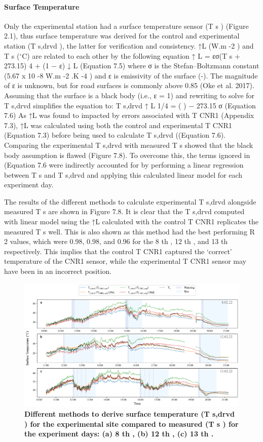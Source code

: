 \documentclass[final,3p,times,authoryear]{elsarticle}
\begin{document}
\paragraph{Surface Temperature}\label{sec:appendix7.4.2}

Only the experimental station had a surface temperature sensor (T s ) (Figure 2.1), thus
surface temperature was derived for the control and experimental station (T s,drvd ), the
latter for verification and consistency. ↑L (W.m -2 ) and T s ($^{\circ}$C) are related to each other
by the following equation
↑ L = εσ(T s + 273.15) 4 + (1 − ε) ↓ L
(Equation 7.5)
where σ is the Stefan–Boltzmann constant (5.67 x 10 -8 W.m -2 .K -4 ) and ε is emissivity of
the surface (-). The magnitude of ε is unknown, but for road surfaces is commonly
above 0.85 (Oke et al. 2017). Assuming that the surface is a black body (i.e., ε = 1) and
rewriting to solve for T s,drvd simplifies the equation to:
T s,drvd
↑ L 1/4
= ( ) − 273.15
σ
(Equation 7.6)
As ↑L was found to impacted by errors associated with T CNR1 (Appendix 7.3), ↑L was
calculated using both the control and experimental T CNR1 (Equation 7.3) before being
used to calculate T s,drvd ((Equation 7.6). Comparing the experimental T s,drvd with
measured T s showed that the black body assumption is flawed (Figure 7.8). To
overcome this, the terms ignored in (Equation 7.6 were indirectly accounted for by
performing a linear regression between T s and T s,drvd and applying this calculated linear
model for each experiment day.

The results of the different methods to calculate experimental T s,drvd alongside measured
T s are shown in Figure 7.8. It is clear that the T s,drvd computed with linear model using
the ↑L calculated with the control T CNR1 replicates the measured T s well. This is also
shown as this method had the best performing R 2 values, which were 0.98, 0.98, and
0.96 for the 8 th , 12 th , and 13 th respectively. This implies that the control T CNR1 captured
the ‘correct’ temperature of the CNR1 sensor, while the experimental T CNR1 sensor may
have been in an incorrect position.


\begin{figure}
\centering
\includegraphics[trim={0 0 0 0},clip,scale=1.0]{pict027.png}
\caption{\bf Different methods to derive surface temperature (T s,drvd ) for the experimental site compared to
measured (T s ) for the experiment days: (a) 8 th , (b) 12 th , (c) 13 th .}
 \label{fig:7.8}
\end{figure}
\end{document}
